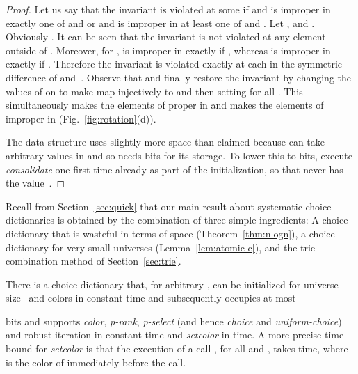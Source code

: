 \documentclass[envcountsame,envcountsect,undated,nolinenumbers]{lnthi}
\def\Tvn#1{\hbox{\textit{#1\/}}}
\begin{document}
\begin{proof}
Let us say that the invariant is violated
at some  if  and  is
improper in exactly one of  and  or  and  is
improper in at least one of  and .
Let , 
 and .
Obviously .
It can be seen that the invariant is not
violated at any element outside of .
Moreover, for ,  is improper in 
exactly if , whereas  is improper in 
exactly if .
Therefore the invariant is violated exactly at each 
in the symmetric difference of  and~.
Observe that  and finally
restore the invariant by changing the values of 
on  to make 
map  injectively to 
and then setting  for all .
This simultaneously makes the elements
of  proper in  and makes the elements
of  improper in 
(Fig.~\ref{fig:rotation}(d)).

The data structure uses slightly
more space than claimed because  can take
arbitrary values in  and so needs
 bits for its storage.
To lower this to  bits, execute
\Tvn{consolidate} one first time already as part
of the initialization, so that  never has
the value~.
\end{proof}

Recall from Section~\ref{sec:quick} that
our main result about systematic choice dictionaries
is
obtained by the combination of three simple ingredients:
A choice dictionary that is wasteful in terms
of space (Theorem~\ref{thm:nlogn}), a choice
dictionary for very small universes
(Lemma~\ref{lem:atomic-c}), and the
trie-combination method of
Section~\ref{sec:trie}.

\begin{theorem}
\label{thm:nlogn}There is a choice dictionary that,
for arbitrary ,
can be initialized for universe size~
and  colors in constant time
and subsequently
occupies at most

bits and supports \Tvn{color}, \Tvn{p-rank}, \Tvn{p-select}
(and hence \Tvn{choice} and \Tvn{uniform-choice})
and robust iteration in constant time 
and \Tvn{setcolor} in  time.
A more precise time bound for \Tvn{setcolor} is
that the execution of a call ,
for all  and ,
takes  time, where  is the color of 
immediately before the call.
\end{theorem}
\end{document}
